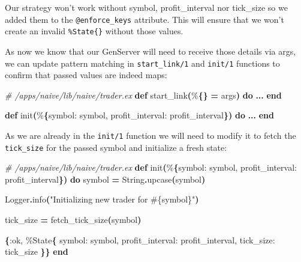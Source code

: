 \documentclass[
  oneside]{book}
\newenvironment{Shaded}{\begin{snugshade}}{\end{snugshade}}
\newcommand{\CommentTok}[1]{\textcolor[rgb]{0.56,0.35,0.01}{\textit{#1}}}
\newcommand{\ConstantTok}[1]{\textcolor[rgb]{0.56,0.35,0.01}{#1}}
\newcommand{\FunctionTok}[1]{\textcolor[rgb]{0.13,0.29,0.53}{\textbf{#1}}}
\newcommand{\KeywordTok}[1]{\textcolor[rgb]{0.13,0.29,0.53}{\textbf{#1}}}
\newcommand{\NormalTok}[1]{#1}
\newcommand{\OperatorTok}[1]{\textcolor[rgb]{0.81,0.36,0.00}{\textbf{#1}}}
\newcommand{\OtherTok}[1]{\textcolor[rgb]{0.56,0.35,0.01}{#1}}
\newcommand{\StringTok}[1]{\textcolor[rgb]{0.31,0.60,0.02}{#1}}
\newcommand{\VariableTok}[1]{\textcolor[rgb]{0.00,0.00,0.00}{#1}}
\begin{document}
Our strategy won't work without symbol, profit\_interval nor tick\_size so we added them to the \texttt{@enforce\_keys} attribute. This will ensure that we won't create an invalid \texttt{\%State\{\}} without those values.

\newpage

As now we know that our GenServer will need to receive those details via args, we can update pattern matching in \texttt{start\_link/1} and \texttt{init/1} functions to confirm that passed values are indeed maps:

\begin{Shaded}
\begin{Highlighting}[]
  \CommentTok{\# /apps/naive/lib/naive/trader.ex}
  \KeywordTok{def}\NormalTok{ start\_link}\FunctionTok{(}\NormalTok{\%}\FunctionTok{\{\}} \OperatorTok{=}\NormalTok{ args}\FunctionTok{)} \KeywordTok{do}
    \OperatorTok{...}
  \KeywordTok{end}

  \KeywordTok{def}\NormalTok{ init}\FunctionTok{(}\NormalTok{\%}\FunctionTok{\{}\VariableTok{symbol:}\NormalTok{ symbol, }\VariableTok{profit\_interval:}\NormalTok{ profit\_interval}\FunctionTok{\})} \KeywordTok{do}
    \OperatorTok{...}
  \KeywordTok{end}
\end{Highlighting}
\end{Shaded}

As we are already in the \texttt{init/1} function we will need to modify it to fetch the \texttt{tick\_size} for the passed symbol and initialize a fresh state:

\begin{Shaded}
\begin{Highlighting}[]
  \CommentTok{\# /apps/naive/lib/naive/trader.ex}
  \KeywordTok{def}\NormalTok{ init}\FunctionTok{(}\NormalTok{\%}\FunctionTok{\{}\VariableTok{symbol:}\NormalTok{ symbol, }\VariableTok{profit\_interval:}\NormalTok{ profit\_interval}\FunctionTok{\})} \KeywordTok{do}
\NormalTok{    symbol }\OperatorTok{=} \ConstantTok{String}\OperatorTok{.}\NormalTok{upcase}\FunctionTok{(}\NormalTok{symbol}\FunctionTok{)}

    \ConstantTok{Logger}\OperatorTok{.}\NormalTok{info}\FunctionTok{(}\StringTok{"Initializing new trader for }\OtherTok{\#\{}\NormalTok{symbol}\OtherTok{\}}\StringTok{"}\FunctionTok{)}

\NormalTok{    tick\_size }\OperatorTok{=}\NormalTok{ fetch\_tick\_size}\FunctionTok{(}\NormalTok{symbol}\FunctionTok{)}

    \FunctionTok{\{}\VariableTok{:ok}\NormalTok{,}
\NormalTok{     \%}\ConstantTok{State}\FunctionTok{\{}
       \VariableTok{symbol:}\NormalTok{ symbol,}
       \VariableTok{profit\_interval:}\NormalTok{ profit\_interval,}
       \VariableTok{tick\_size:}\NormalTok{ tick\_size}
     \FunctionTok{\}\}}
  \KeywordTok{end}
\end{Highlighting}
\end{Shaded}
\end{document}
